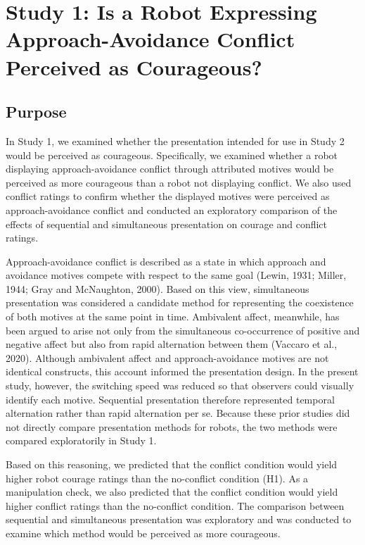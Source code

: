 \documentclass[utf8]{FrontiersinHarvard}
\begin{document}
\section{Study 1: Is a Robot Expressing Approach-Avoidance Conflict Perceived as Courageous?}\label{study-1-is-a-robot-expressing-approach-avoidance-conflict-perceived-as-courageous}

\subsection{Purpose}\label{purpose}

In Study 1, we examined whether the presentation intended for use in Study 2 would be perceived as courageous. Specifically, we examined whether a robot displaying approach-avoidance conflict through attributed motives would be perceived as more courageous than a robot not displaying conflict. We also used conflict ratings to confirm whether the displayed motives were perceived as approach-avoidance conflict and conducted an exploratory comparison of the effects of sequential and simultaneous presentation on courage and conflict ratings.

Approach-avoidance conflict is described as a state in which approach and avoidance motives compete with respect to the same goal (Lewin, 1931; Miller, 1944; Gray and McNaughton, 2000). Based on this view, simultaneous presentation was considered a candidate method for representing the coexistence of both motives at the same point in time. Ambivalent affect, meanwhile, has been argued to arise not only from the simultaneous co-occurrence of positive and negative affect but also from rapid alternation between them (Vaccaro et al., 2020). Although ambivalent affect and approach-avoidance motives are not identical constructs, this account informed the presentation design. In the present study, however, the switching speed was reduced so that observers could visually identify each motive. Sequential presentation therefore represented temporal alternation rather than rapid alternation per se. Because these prior studies did not directly compare presentation methods for robots, the two methods were compared exploratorily in Study 1.

Based on this reasoning, we predicted that the conflict condition would yield higher robot courage ratings than the no-conflict condition (H1). As a manipulation check, we also predicted that the conflict condition would yield higher conflict ratings than the no-conflict condition. The comparison between sequential and simultaneous presentation was exploratory and was conducted to examine which method would be perceived as more courageous.
\end{document}
